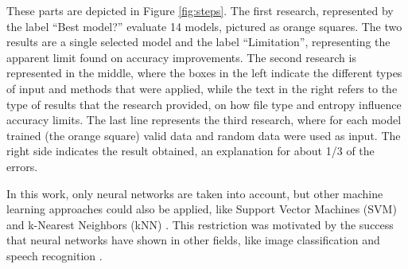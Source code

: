 These parts are depicted in Figure \ref{fig:steps}. The first research, represented by the label ``Best model?'' evaluate 14 models, pictured as orange squares. The two results are a single selected model and the label ``Limitation'', representing the apparent limit found on accuracy improvements. The second research is represented in the middle, where the boxes in the left indicate the different types of input and methods that were applied, while the text in the right refers to the type of results that the research provided, on how file type and entropy influence accuracy limits. The last line represents the third research, where for each model trained (the orange square) valid data and random data were used as input. The right side indicates the result obtained, an explanation for about 1/3 of the errors.

In this work, only neural networks are taken into account, but other machine learning approaches could also be applied, like Support Vector Machines (SVM) \cite{fitzgerald_using_2012} and k-Nearest Neighbors (kNN) \cite{axelsson_normalised_2010}. This restriction was motivated by the success that neural networks have shown in other fields, like image classification \cite{matan_reading_1992} and speech recognition \cite{graves_speech_2013}.
